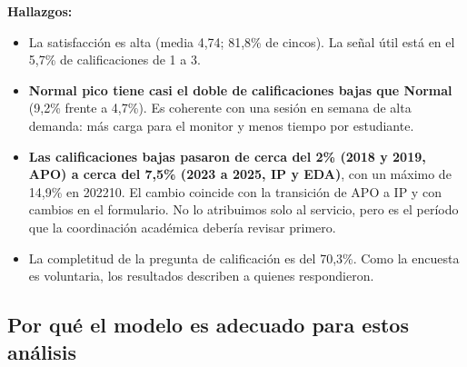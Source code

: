 \documentclass[11pt,letterpaper]{article}
\begin{document}
\textbf{Hallazgos:}

\begin{itemize}[leftmargin=1.5em,itemsep=2pt]
\item La satisfacción es alta (media 4,74; 81,8\% de cincos). La señal útil está en el 5,7\% de calificaciones de 1 a 3.
\item \textbf{Normal pico tiene casi el doble de calificaciones bajas que Normal} (9,2\% frente a 4,7\%). Es coherente con una sesión en semana de alta demanda: más carga para el monitor y menos tiempo por estudiante.
\item \textbf{Las calificaciones bajas pasaron de cerca del 2\% (2018 y 2019, APO) a cerca del 7,5\% (2023 a 2025, IP y EDA)}, con un máximo de 14,9\% en 202210. El cambio coincide con la transición de APO a IP y con cambios en el formulario. No lo atribuimos solo al servicio, pero es el período que la coordinación académica debería revisar primero.
\item La completitud de la pregunta de calificación es del 70,3\%. Como la encuesta es voluntaria, los resultados describen a quienes respondieron.
\end{itemize}

\subsection{Por qué el modelo es adecuado para estos análisis}
\end{document}

